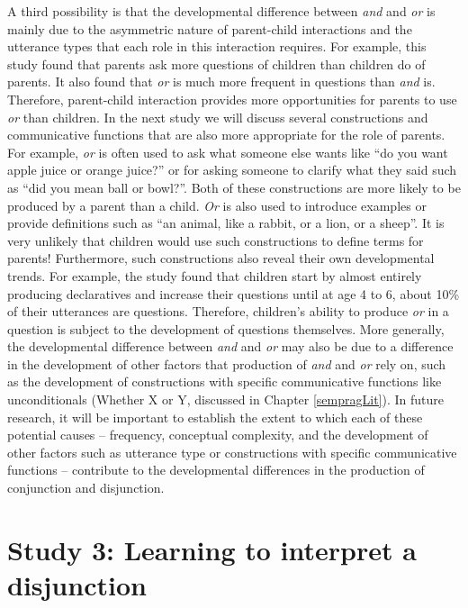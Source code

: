 \documentclass[floatsintext,man]{apa6}
\theoremstyle{definition}
\theoremstyle{definition}
\theoremstyle{definition}
\theoremstyle{remark}
\begin{document}
A third possibility is that the developmental difference between
\emph{and} and \emph{or} is mainly due to the asymmetric nature of
parent-child interactions and the utterance types that each role in this
interaction requires. For example, this study found that parents ask
more questions of children than children do of parents. It also found
that \emph{or} is much more frequent in questions than \emph{and} is.
Therefore, parent-child interaction provides more opportunities for
parents to use \emph{or} than children. In the next study we will
discuss several constructions and communicative functions that are also
more appropriate for the role of parents. For example, \emph{or} is
often used to ask what someone else wants like \enquote{do you want
apple juice or orange juice?} or for asking someone to clarify what they
said such as \enquote{did you mean ball or bowl?}. Both of these
constructions are more likely to be produced by a parent than a child.
\emph{Or} is also used to introduce examples or provide definitions such
as \enquote{an animal, like a rabbit, or a lion, or a sheep}. It is very
unlikely that children would use such constructions to define terms for
parents! Furthermore, such constructions also reveal their own
developmental trends. For example, the study found that children start
by almost entirely producing declaratives and increase their questions
until at age 4 to 6, about 10\% of their utterances are questions.
Therefore, children's ability to produce \emph{or} in a question is
subject to the development of questions themselves. More generally, the
developmental difference between \emph{and} and \emph{or} may also be
due to a difference in the development of other factors that production
of \emph{and} and \emph{or} rely on, such as the development of
constructions with specific communicative functions like unconditionals
(Whether X or Y, discussed in Chapter \ref{sempragLit}). In future
research, it will be important to establish the extent to which each of
these potential causes -- frequency, conceptual complexity, and the
development of other factors such as utterance type or constructions
with specific communicative functions -- contribute to the developmental
differences in the production of conjunction and disjunction.

\section{Study 3: Learning to interpret a
disjunction}\label{study-3-learning-to-interpret-a-disjunction}
\end{document}
